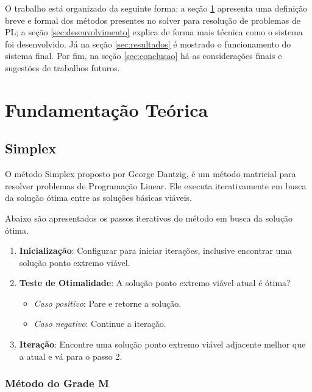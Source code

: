 \documentclass [11pt]{articleSBPO}
\begin{document}
O trabalho está organizado da seguinte forma: a seção \ref{sec:fundamentacao} apresenta uma definição breve e formal dos métodos presentes no solver para resolução de problemas de PL; a seção \ref{sec:desenvolvimento} explica de forma mais técnica como o sistema foi desenvolvido. Já na seção \ref{sec:resultados} é mostrado o funcionamento do sistema final. Por fim, na seção \ref{sec:conclusao} há as considerações finais e sugestões de trabalhos futuros.

\section{Fundamentação Teórica}\label{sec:fundamentacao}


\subsection{Simplex}\label{subsec:Simplex}

O método Simplex proposto por George Dantzig, é um método matricial para resolver problemas de Programação Linear. Ele executa iterativamente em busca da solução ótima entre as soluções básicas viáveis. 

Abaixo são apresentados os passos iterativos do método em busca da solução ótima.

\begin{enumerate}
	\item \textbf{Inicialização}: Configurar para iniciar iterações, inclusive encontrar uma solução ponto extremo viável.
	\item \textbf{Teste de Otimalidade}: A solução ponto extremo viável atual é ótima?
	\begin{itemize}
		\item \textit{Caso positivo}: Pare e retorne a solução.
		\item \textit{Caso negativo}: Continue a iteração.
	\end{itemize}
	\item \textbf{Iteração}: Encontre uma solução ponto extremo viável adjacente melhor que a atual e vá para o passo 2.
\end{enumerate}

\subsubsection{Método do Grade M}\label{subsubsec:grandem}
\end{document}
